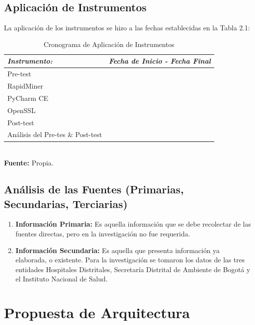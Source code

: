 \documentclass[a4paper,openright,12pt]{book}
\theoremstyle{definition}
\theoremstyle{remark}
\begin{document}
    \subsection{Aplicación de Instrumentos}
La aplicación de los instrumentos se hizo a las fechas establecidas en la Tabla 2.1:
\begin{table}[ht]
\centering
\caption{Cronograma de Aplicación de Instrumentos}
\begin{tabular}{>{\centering\arraybackslash}m{3cm} >{\arraybackslash}m{8cm} }
\hline
\textbf{\textit{Instrumento:}} & \textbf{\textit{Fecha de Inicio - Fecha Final}} \\ \hline
Pre-test & {\centering{Agosto 15 del 2016 - Septiembre 18 del 2016 }} \\ \hline
RapidMiner & {\centering{Septiembre 26 del 2016 - Octubre 10 del 2016 }} \\ \hline
PyCharm CE & {\centering{Septiembre 30 del 2016 - Octubre 10 del 2016 }} \\ \hline
OpenSSL & {\centering{Octubre 11 del 2016 - Octubre 18 del 2016 }} \\ \hline
Post-test & {\centering{Octubre 11 del 2016 - Octubre 14 del 2016 }} \\ \hline
Análisis del Pre-tes \& Post-test & {\centering{Octubre 18 del 2016 - Octubre 26 del 2016 }} \\ \hline
\end{tabular}
\label{tabla:Cronograma}
\\\textbf{Fuente:} Propia.
\end{table}
    \subsection{Análisis de las Fuentes (Primarias, Secundarias, Terciarias)}
    \begin{enumerate}
		\item \textbf{Información Primaria:} Es aquella información que se debe recolectar de las fuentes directas, pero en la investigación no fue requerida.
        \item \textbf{Información Secundaria:} Es aquella que presenta información ya elaborada, o existente. Para la investigación se tomaron los datos de las tres entidades Hospitales Distritales, Secretaría Distrital de Ambiente de Bogotá y el Instituto Nacional de Salud.
	\end{enumerate}
\section{Propuesta de Arquitectura}
\end{document}
